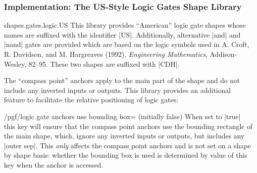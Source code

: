 \subsubsection{Implementation: The US-Style Logic Gates Shape Library}

\begin{pgflibrary}{shapes.gates.logic.US}
    This library provides ``American'' logic gate shapes whose names are
    suffixed with the identifier |US|. Additionally, alternative |and| and
    |nand| gates are provided which are based on the logic symbols used in A.
    Croft, R. Davidson, and M. Hargreaves (1992), \emph{Engineering
    Mathematics}, Addison-Wesley, 82--95. These two shapes are suffixed with
    |CDH|.

    The ``compass point'' anchors apply to the main part of the shape and do
    not include any inverted inputs or outputs. This library provides an
    additional feature to facilitate the relative positioning of logic gates:

    \begin{key}{/pgf/logic gate anchors use bounding box= (initially false)}
        When set to |true| this key will ensure that the compass point anchors
        use the bounding rectangle of the main shape, which, ignore any
        inverted inputs or outputs, but includes any |outer sep|. This
        \emph{only} affects the compass point anchors and is not set on a shape
        by shape basis: whether the bounding box is used is determined by value
        of this key when the anchor is accessed.
\begin{codeexample}[preamble={\usetikzlibrary{circuits.logic.US}}]
\end{codeexample}
    \end{key}


\end{pgflibrary}
